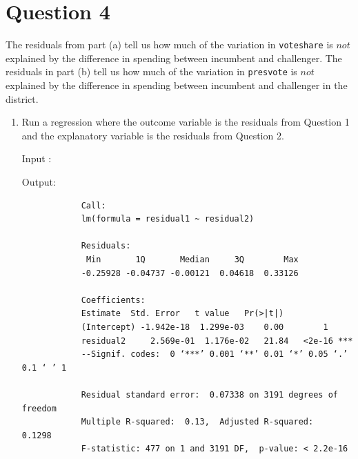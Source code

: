 \documentclass[12pt,letterpaper]{article}
\begin{document}
\section*{Question 4}
\noindent The residuals from part (a) tell us how much of the variation in \texttt{voteshare} is $not$ explained by the difference in spending between incumbent and challenger. The residuals in part (b) tell us how much of the variation in \texttt{presvote} is $not$ explained by the difference in spending between incumbent and challenger in the district.
	\begin{enumerate}
		\item Run a regression where the outcome variable is the residuals from Question 1 and the explanatory variable is the residuals from Question 2.	
				
		\noindent Input :
		  
		
		
		Output:
		\begin{verbatim}
			Call:
			lm(formula = residual1 ~ residual2)
			
			Residuals:    
			 Min       1Q       Median     3Q        Max 
			-0.25928 -0.04737 -0.00121  0.04618  0.33126 
			
			Coefficients:            
			Estimate  Std. Error   t value   Pr(>|t|)    
			(Intercept) -1.942e-18  1.299e-03    0.00        1 
			residual2     2.569e-01  1.176e-02   21.84   <2e-16 ***
			--Signif. codes:  0 ‘***’ 0.001 ‘**’ 0.01 ‘*’ 0.05 ‘.’ 0.1 ‘ ’ 1
			
			Residual standard error:  0.07338 on 3191 degrees of freedom
			Multiple R-squared:  0.13,	Adjusted R-squared:      0.1298 
			F-statistic: 477 on 1 and 3191 DF,  p-value: < 2.2e-16
			
		\end{verbatim}
		\normalsize
		

\end{enumerate}
\end{document}
